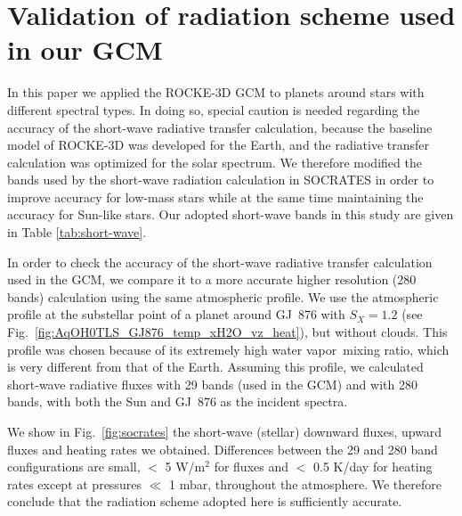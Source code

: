 \documentclass[11pt,numberedappendix,twocolappendix,]{emulateapj}
\newcommand{\wv}{water vapor\ }
\begin{document}
\section{Validation of radiation scheme used in our GCM}
\label{ap:radiation}

In this paper we applied the ROCKE-3D GCM to planets around stars with different spectral types. 
In doing so, special caution is needed regarding the accuracy of the short-wave radiative transfer calculation, because the baseline model of ROCKE-3D was  developed for the Earth, and the radiative transfer calculation was optimized for the solar spectrum. 
We therefore modified the bands used by the short-wave radiation calculation in SOCRATES in order to improve accuracy for low-mass stars while at the same time maintaining the accuracy for Sun-like stars.
Our adopted short-wave bands in this study are given in Table \ref{tab:short-wave}.

In order to check the accuracy of the short-wave radiative transfer calculation used in the GCM, we compare it to a more accurate higher resolution (280 bands) calculation using the same atmospheric profile. 
We use the atmospheric profile at the substellar point of a planet around GJ~876 with $S_X=1.2$ (see Fig.~\ref{fig:AqOH0TLS_GJ876_temp_xH2O_vz_heat}), but without clouds.
This profile was chosen because of its extremely high \wv mixing ratio, which is very different from that of the Earth. 
Assuming this profile, we calculated short-wave radiative fluxes with 29 bands (used in the GCM) and with 280 bands, with both the Sun and GJ~876 as the incident spectra.

We show in Fig.~\ref{fig:socrates} the short-wave (stellar) downward fluxes, upward fluxes and heating rates we obtained.
Differences between the 29 and 280 band configurations are small, $<$ 5 W/m$^2$ for fluxes and $<$ 0.5 K/day for heating rates except at pressures $\ll$ 1 mbar, throughout the atmosphere. We therefore conclude that the radiation scheme adopted here is sufficiently accurate.
\end{document}
